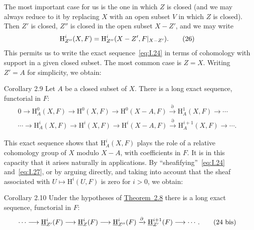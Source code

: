 The most important case for us is the one in which $Z$ is closed (and we may
always reduce to it by replacing $X$ with an open subset $V$ in which $Z$ is
closed). Then $Z'$ is closed, $Z''$ is closed in the open subset $X-Z'$, and
we may write
\begin{equation}
  \mathrm H_{Z''}^i(X,F)
  =\mathrm H_{Z''}^i(X-Z',F\vert_{X-Z'}).
  \tag{26}\label{eq:I.26}
\end{equation}
This permits us to write the exact sequence~\eqref{eq:I.24} in terms of
cohomology with support in a given closed subset. The most common
case is $Z=X$. Writing $Z'=A$ for simplicity, we obtain:

\begin{sgastatement}{Corollary 2.9}
Let $A$ be a closed subset of $X$. There is a long exact sequence,
functorial in $F$:
\begin{equation}
\begin{gathered}
  0\longrightarrow \mathrm H_A^0(X,F)
  \longrightarrow \mathrm H^0(X,F)
  \longrightarrow \mathrm H^0(X-A,F)
  \xrightarrow{\partial} \mathrm H_A^1(X,F)\longrightarrow\cdots \\
  \cdots\longrightarrow \mathrm H_A^i(X,F)
  \longrightarrow \mathrm H^i(X,F)
  \longrightarrow \mathrm H^i(X-A,F)
  \xrightarrow{\partial} \mathrm H_A^{i+1}(X,F)
  \longrightarrow\cdots .
\end{gathered}
\tag{27}\label{eq:I.27}
\end{equation}
\end{sgastatement}

This exact sequence shows that $\mathrm H_A^i(X,F)$ plays the role of a
relative cohomology group of $X$ modulo $X-A$, with coefficients in $F$. It
is in this capacity that it arises naturally in applications. By
``sheafifying''~\eqref{eq:I.24} and~\eqref{eq:I.27}, or by arguing directly,
and taking into account that the sheaf associated with
$U\mapsto\mathrm H^i(U,F)$ is zero for $i>0$, we obtain:

\begin{sgastatement}{Corollary 2.10}
Under the hypotheses of \hyperref[I.2.8]{Theorem~2.8} there is a long exact sequence,
functorial in $F$:
\begin{equation}
  \cdots\longrightarrow \mathop{\underline{\mathrm H}}\nolimits_{Z'}^i(F)
  \longrightarrow \mathop{\underline{\mathrm H}}\nolimits_Z^i(F)
  \longrightarrow \mathop{\underline{\mathrm H}}\nolimits_{Z''}^i(F)
  \xrightarrow{\partial}\mathop{\underline{\mathrm H}}\nolimits_{Z'}^{i+1}(F)
  \longrightarrow\cdots .
  \tag{24 bis}\label{eq:I.24bis}
\end{equation}
\end{sgastatement}

